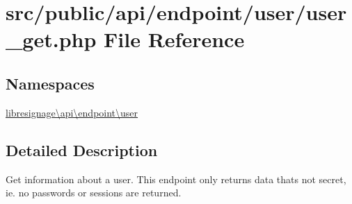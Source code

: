 \hypertarget{src_2public_2api_2endpoint_2user_2user__get_8php}{}\section{src/public/api/endpoint/user/user\+\_\+get.php File Reference}
\label{src_2public_2api_2endpoint_2user_2user__get_8php}
\subsection*{Namespaces}
\begin{DoxyCompactItemize}
\item 
 \hyperlink{namespacelibresignage_1_1api_1_1endpoint_1_1user}{libresignage\textbackslash{}api\textbackslash{}endpoint\textbackslash{}user}
\end{DoxyCompactItemize}


\subsection{Detailed Description}
Get information about a user. This endpoint only returns data that\textquotesingle{}s not secret, ie. no passwords or sessions are returned.

